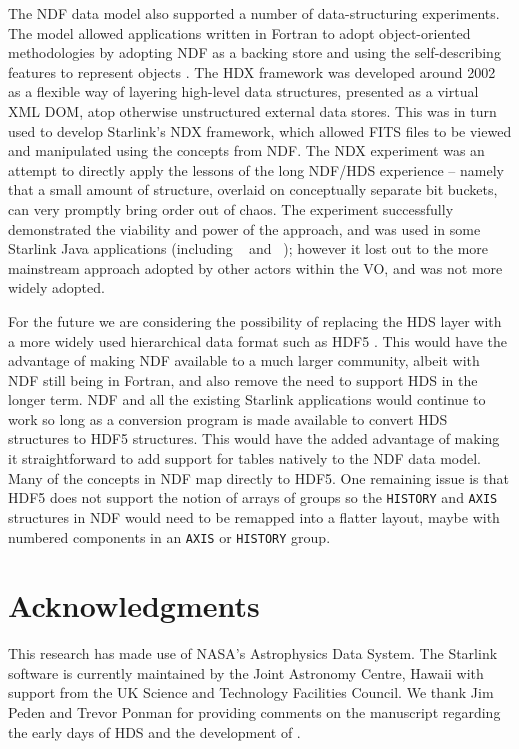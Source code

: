 \documentclass[final,authoryear,5p,times,twocolumn]{elsarticle}
\begin{document}
The NDF data model also supported a number of data-structuring
experiments.
The model allowed applications written in Fortran to
adopt object-oriented methodologies by adopting NDF as a backing store
and using the self-describing features to represent objects
\citep{1993ASPC...52..199B}.
The HDX framework \citep{2003ASPC..295..221G} was developed around 2002 as a flexible
way of layering high-level data structures, presented as a virtual XML
DOM, atop otherwise unstructured external data stores.  This was in
turn used to develop Starlink's NDX framework,\label{sec:ndx} which allowed FITS
files to be viewed and manipulated using the concepts from NDF.
The NDX experiment was an attempt to directly apply the
lessons of the long NDF/HDS experience -- namely that a small amount of
structure, overlaid on conceptually separate bit buckets, can very
promptly bring order out of chaos.
The experiment successfully demonstrated the viability and power of
the approach, and was used in some Starlink Java applications
(including \treeview\ \citep{2003ASPC..295..445B} and \splat\
\citep[][]{2005ASPC..347...22D,2014Skoda}); however it
lost out to the more mainstream approach adopted by other actors
within the VO, and was not more widely adopted.

For the future we are considering the possibility of replacing the HDS
layer with a more widely used hierarchical data format such as HDF5
\citep{Folk:2011:OHT:1966895.1966900}. This would have the advantage
of making NDF available to a much larger community, albeit with NDF
still being in Fortran, and also remove the
need to support HDS in the longer term. NDF and all the existing
Starlink applications would continue to work so long as a conversion
program is made available to convert HDS structures to HDF5 structures.
This would have the added advantage of making it straightforward to
add support for tables natively to the NDF data model. Many of the
concepts in NDF map directly to HDF5. One remaining issue is that HDF5
does not support the notion of arrays of groups so the
\texttt{HISTORY} and \texttt{AXIS} structures in NDF would need to be
remapped into a flatter layout, maybe with numbered components in an
\texttt{AXIS} or \texttt{HISTORY} group.

\section{Acknowledgments}

This research has made use of NASA's Astrophysics Data System.
The Starlink software is currently maintained by the Joint Astronomy
Centre, Hawaii with support from the UK Science and Technology
Facilities Council. We thank Jim Peden and Trevor Ponman for providing
comments on the manuscript regarding the early days of HDS and the
development of \asterix.
\end{document}
